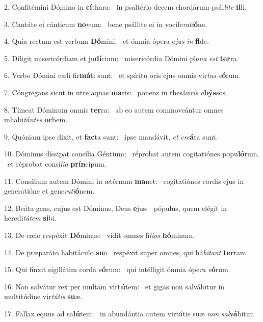 2. Confitémini Dómino in \textbf{cí}thara: \ast\  in psaltério decem chordárum psál\textit{li}\textit{te} \textbf{il}li.\

3. Cantáte ei cánticum \textbf{no}vum: \ast\  bene psállite ei in vocife\textit{ra}\textit{ti}\textbf{ó}ne.\

4. Quia rectum est verbum \textbf{Dó}mini, \ast\  et ómnia ópera e\textit{jus} \textit{in} \textbf{fi}de.\

5. Díligit misericórdiam et ju\textbf{dí}cium: \ast\  misericórdia Dómini ple\textit{na} \textit{est} \textbf{ter}ra.\

6. Verbo Dómini cæli fir\textbf{má}ti sunt: \ast\  et spíritu oris ejus omnis vir\textit{tus} \textit{e}\textbf{ó}rum.\

7. Cóngregans sicut in utre aquas \textbf{ma}ris: \ast\  ponens in thesáu\textit{ris} \textit{a}\textbf{býs}sos.\

8. Tímeat Dóminum omnis \textbf{ter}ra: \ast\  ab eo autem commoveántur omnes inhabi\textit{tán}\textit{tes} \textbf{or}bem.\

9. Quóniam ipse dixit, et \textbf{fac}ta sunt: \ast\  ipse mandávit, \textit{et} \textit{cre}\textbf{á}ta sunt.\

10. Dóminus díssipat consília Géntium: \dag\  réprobat autem cogitatiónes popu\textbf{ló}rum, \ast\  et réprobat consí\textit{li}\textit{a} \textbf{prín}cipum.\

11. Consílium autem Dómini in ætérnum \textbf{ma}net: \ast\  cogitatiónes cordis ejus in generatióne et gene\textit{ra}\textit{ti}\textbf{ó}nem.\

12. Beáta gens, cujus est Dóminus, Deus \textbf{e}jus: \ast\  pópulus, quem elégit in heredi\textit{tá}\textit{tem} \textbf{si}bi.\

13. De cælo respéxit \textbf{Dó}minus: \ast\  vidit omnes fí\textit{li}\textit{os} \textbf{hó}minum.\

14. De præparáto habitáculo \textbf{su}o \ast\  respéxit super omnes, qui há\textit{bi}\textit{tant} \textbf{ter}ram.\

15. Qui finxit sigillátim corda e\textbf{ó}rum: \ast\  qui intélligit ómnia ópe\textit{ra} \textit{e}\textbf{ó}rum.\

16. Non salvátur rex per multam vir\textbf{tú}tem: \ast\  et gigas non salvábitur in multitúdine vir\textit{tú}\textit{tis} \textbf{su}æ.\

17. Fallax equus ad sa\textbf{lú}tem: \ast\  in abundántia autem virtútis suæ \textit{non} \textit{sal}\textbf{vá}bitur.\

